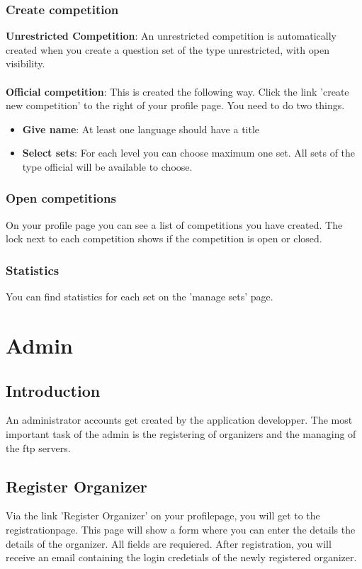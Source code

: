 \documentclass[11pt,a4paper]{report}
\begin{document}
\subsection{Create competition}
\textbf{Unrestricted Competition}: An unrestricted competition is automatically created when you create a question set of the type unrestricted, with open visibility.
\\ \\
\textbf{Official competition}: This is created the following way. Click the link 'create new competition' to the right of your profile page. You need to do two things.
\begin{itemize}
		\item \textbf{Give name}: At least one language should have a title 
		\item \textbf{Select sets}: For each level you can choose maximum one set. All sets of the type official will be available to choose.  
\end{itemize}

\subsection{Open competitions}
On your profile page you can see a list of competitions you have created. The lock next to each competition shows if the competition is open or closed.

\subsection{Statistics}
You can find statistics for each set on the 'manage sets' page.

\chapter{Admin}

\section{Introduction}
An administrator accounts get created by the application developper. The most important task of the admin is the registering of organizers and the managing of the ftp servers. 
\section{Register Organizer}
Via the link 'Register Organizer' on your profilepage, you will get to the registrationpage. This page will show a form where you can enter the details the details of the organizer. All fields are requiered. After registration, you will receive an email containing the login credetials of the newly registered organizer.
\end{document}

